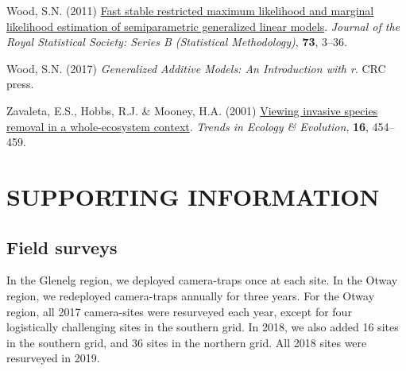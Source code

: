 \documentclass[preprint, 3p, authoryear]{elsarticle} %
\newlength{\cslhangindent}
\newlength{\cslentryspacingunit} %
\newenvironment{CSLReferences}[2] %
 {%
  \setlength{\parindent}{0pt}
  \ifodd #1
  \let\oldpar\par
  \def\par{\hangindent=\cslhangindent\oldpar}
  \fi
  \setlength{\parskip}{#2\cslentryspacingunit}
 }%
 {}
\newcommand{\beginsupplement}{\setcounter{table}{0}  \renewcommand{\thetable}{S\arabic{table}} \setcounter{figure}{0} \renewcommand{\thefigure}{S\arabic{figure}} \setcounter{section}{1} \renewcommand{\thesection}{S\arabic{section}}}
\begin{document}
\begin{CSLReferences}{1}{0}
\leavevmode{}%
Wood, S.N. (2011) \href{\%20https://doi.org/10.1111/j.1467-9868.2010.00749.x}{Fast stable restricted maximum likelihood and marginal likelihood estimation of semiparametric generalized linear models}. \emph{Journal of the Royal Statistical Society: Series B (Statistical Methodology)}, \textbf{73}, 3--36.

\leavevmode{}%
Wood, S.N. (2017) \emph{Generalized Additive Models: An Introduction with r}. CRC press.

\leavevmode{}%
Zavaleta, E.S., Hobbs, R.J. \& Mooney, H.A. (2001) \href{https://doi.org/10.1016/S0169-5347(01)02194-2}{Viewing invasive species removal in a whole-ecosystem context}. \emph{Trends in Ecology \& Evolution}, \textbf{16}, 454--459.

\end{CSLReferences}

\newpage
\beginsupplement
\setcounter{page}{1}

\hypertarget{supporting-information}{%
\section*{SUPPORTING INFORMATION}\label{supporting-information}}

\hypertarget{density-app-field}{%
\subsection{Field surveys}\label{density-app-field}}

In the Glenelg region, we deployed camera-traps once at each site. In the Otway region, we redeployed camera-traps annually for three years. For the Otway region, all 2017 camera-sites were resurveyed each year, except for four logistically challenging sites in the southern grid. In 2018, we also added 16 sites in the southern grid, and 36 sites in the northern grid. All 2018 sites were resurveyed in 2019.
\end{document}
